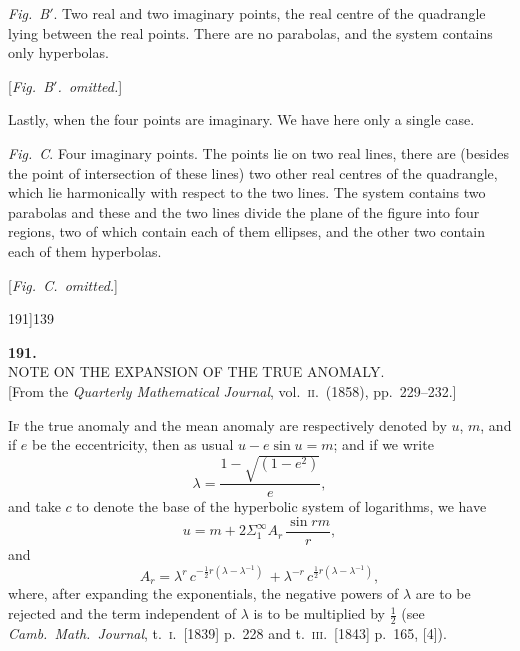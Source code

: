 \documentclass[11pt]{article}
\begin{document}
\medskip

\noindent \emph{Fig.~B$'$}. Two real and two imaginary points, the real centre of the quadrangle lying between the real points. There are no parabolas, and the system contains only hyperbolas.

\begin{center}
[\emph{Fig.\ B$'$.\ omitted.}]
\end{center}

Lastly, when the four points are imaginary. We have here only a single case.

\emph{Fig.~C}. Four imaginary points. The points lie on two real lines, there are (besides the point of intersection of these lines) two other real centres of the quadrangle, which lie harmonically with respect to the two lines. The system contains two parabolas and these and the two lines divide the plane of the figure into four regions, two of which contain each of them ellipses, and the other two contain each of them hyperbolas.

\begin{center}
[\emph{Fig.\ C.\ omitted.}]
\end{center}

\newpage

\begin{center}
\small 191]\hfill\textsc{}\hfill\textsc{139}
\end{center}

\bigskip

\begin{center}
{\Large\bfseries 191.}\\[8pt]
{\large NOTE ON THE EXPANSION OF THE TRUE ANOMALY.}\\[6pt]
\small [From the \emph{Quarterly Mathematical Journal}, vol.~\textsc{ii}.\ (1858), pp.~229--232.]
\end{center}

\bigskip

\noindent \textsc{If} the true anomaly and the mean anomaly are respectively denoted by $u$, $m$, and if $e$ be the eccentricity, then as usual $u - e\sin u = m$; and if we write
\[
\lambda = \frac{1 - \sqrt{(1 - e^{2})}}{e},
\]
and take $c$ to denote the base of the hyperbolic system of logarithms, we have
\[
u = m + 2\Sigma_{1}^{\infty} A_{r}\,\frac{\sin r m}{r},
\]
and
\[
A_{r} = \lambda^{r}\,c^{-\frac{1}{2}r(\lambda - \lambda^{-1})}\, + \lambda^{-r}\,c^{\frac{1}{2}r(\lambda - \lambda^{-1})},
\]
where, after expanding the exponentials, the negative powers of $\lambda$ are to be rejected and the term independent of $\lambda$ is to be multiplied by $\tfrac{1}{2}$ (see \emph{Camb.\ Math.\ Journal}, t.~\textsc{i}.\ [1839] p.~228 and t.~\textsc{iii}.\ [1843] p.~165, [4]).
\end{document}
